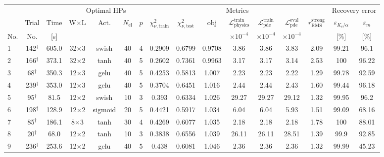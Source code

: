 \begin{tabular}{lcc cccc ccccccc cc}
\toprule
& & & \multicolumn{4}{c}{Optimal HPs} & \multicolumn{7}{c}{Metrics} & \multicolumn{2}{c}{Recovery error} \\
\cmidrule(lr){4-7}\cmidrule(lr){8-14}\cmidrule(lr){15-16}
& Trial & Time & W$\times$L & Act. & $N_{\mathrm{el}}$ & $p$ & $\chi^2_{\nu,\mathrm{train}}$ & $\chi^2_{\nu,\mathrm{test}}$ & $\mathrm{obj}$ & $\mathcal{L}_{\mathrm{physics}}^{\mathrm{train}}$ & $\mathcal{L}_{\mathrm{pde}}^{\mathrm{train}}$ & $\mathcal{L}_{\mathrm{pde}}^{\mathrm{eval}}$ & $r_{\mathrm{RMS}}^{\mathrm{strong}}$ & $\varepsilon_{K_{\mathrm{s}}/\alpha}$ & $\varepsilon_{m}$ \\
No. & No. & [s] &  &  &  &  &  &  &  & $\times 10^{-4}$ & $\times 10^{-4}$ & $\times 10^{-4}$ &  & [\%] & [\%] \\
\midrule
  1 & 142$^\dagger$ & 605.0 & 32$\times$3 & swish & 40 & 4 & \num{0.2909} & \num{0.6799} & \num{0.9708} & 3.86 & 3.86 & 3.83 & 2.09 & \num{99.21} & \num{96.1} \\
  2 & 166$^\dagger$ & 373.1 & 32$\times$2 & tanh & 40 & 5 & \num{0.2602} & \num{0.7361} & \num{0.9963} & 3.17 & 3.17 & 3.14 & 2.53 & \num{100} & \num{96.22} \\
  3 & 68$^\dagger$ & 350.3 & 12$\times$3 & gelu & 40 & 5 & \num{0.4253} & \num{0.5813} & \num{1.007} & 2.23 & 2.23 & 2.22 & 1.29 & \num{99.78} & \num{92.59} \\
  4 & 239$^\dagger$ & 353.0 & 12$\times$3 & gelu & 40 & 5 & \num{0.3704} & \num{0.6451} & \num{1.016} & 2.44 & 2.44 & 2.43 & 1.60 & \num{99.44} & \num{96.18} \\
  5 & 95$^\dagger$ & 81.5 & 12$\times$2 & swish & 10 & 3 & \num{0.393} & \num{0.6334} & \num{1.026} & 29.27 & 29.27 & 29.12 & 1.32 & \num{99.95} & \num{96.2} \\
  6 & 198$^\dagger$ & 128.9 & 12$\times$2 & sigmoid & 20 & 5 & \num{0.4421} & \num{0.5917} & \num{1.034} & 6.04 & 6.04 & 5.93 & 1.51 & \num{99.09} & \num{68.16} \\
  7 & 85$^\dagger$ & 186.1 & 8$\times$3 & tanh & 30 & 4 & \num{0.4269} & \num{0.6077} & \num{1.035} & 2.18 & 2.18 & 2.18 & 1.78 & \num{100} & \num{88.01} \\
  8 & 20$^\dagger$ & 68.0 & 12$\times$2 & tanh & 10 & 3 & \num{0.3838} & \num{0.6556} & \num{1.039} & 26.11 & 26.11 & 28.51 & 1.39 & \num{99.9} & \num{92.85} \\
  9 & 236$^\dagger$ & 253.6 & 12$\times$2 & gelu & 40 & 5 & \num{0.438} & \num{0.6081} & \num{1.046} & 2.36 & 2.36 & 2.36 & 1.32 & \num{99.99} & \num{45.23} \\

\end{tabular}
